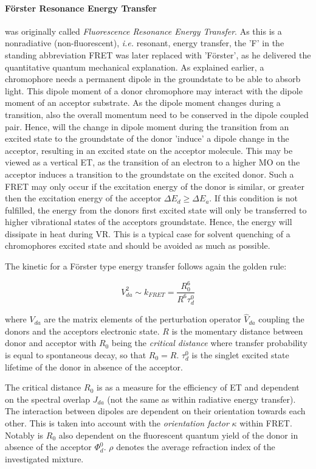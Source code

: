 			\paragraph{Förster Resonance Energy Transfer} was originally called \emph{Fluorescence Resonance Energy Transfer}. As this is a nonradiative (non-fluorescent), \textit{i.e.} resonant, energy transfer, the 'F' in the standing abbreviation FRET was later replaced with 'Förster', as he delivered the quantitative quantum mechanical explanation.%
			As explained earlier, a chromophore needs a permanent dipole in the groundstate to be able to absorb light. This dipole moment of a donor chromophore may interact with the dipole moment of an acceptor substrate. As the dipole moment changes during a transition, also the overall momentum need to be conserved in the dipole coupled  pair. Hence, will the change in dipole moment during the transition from an excited state to the groundstate of the donor 'induce' a dipole change in the acceptor, resulting in an excited state on the acceptor molecule. This may be viewed as a vertical ET, as the transition of an electron to a higher MO on the acceptor induces a transition to the groundstate on the excited donor. Such a FRET may only occur if the excitation energy of the donor is similar, or greater then the excitation energy of the acceptor $\Delta E_d \geq \Delta E_a$. If this condition is not fulfilled, the energy from the donors first excited state will only be transferred to higher vibrational states of the acceptors groundstate. Hence, the energy will dissipate in heat during VR. This is a typical case for solvent quenching of a chromophores excited state and should be avoided as much as possible. 

			The kinetic for a Förster type energy transfer follows again the golden rule:

			\begin{equation}
				  V_{da}^2 \sim k_{FRET} = \frac{R^6_0}{R^6\tau^0_d}
			\end{equation}

			where $V_{da}$ are the matrix elements of the perturbation operator $\hat{V}_{da}$ coupling the donors and the acceptors electronic state. $R$ is the momentary distance between donor and acceptor with $R_0$ being the \emph{critical distance} where transfer probability is equal to spontaneous decay, so that $R_0 = R$. $\tau^0_d$ is the singlet excited state lifetime of the donor in absence of the acceptor. 

			The critical distance $R_0$ is as a measure for the efficiency of ET and dependent on the spectral overlap $J_{da}$ (not the same as within radiative energy transfer). The interaction between dipoles are dependent on their orientation towards each other. This is taken into account with the \emph{orientation factor} $\kappa$ within FRET. Notably is $R_0$ also dependent on the fluorescent quantum yield of the donor in absence of the acceptor $\Phi^0_d$. $\rho$ denotes the average refraction index of the investigated mixture. 

